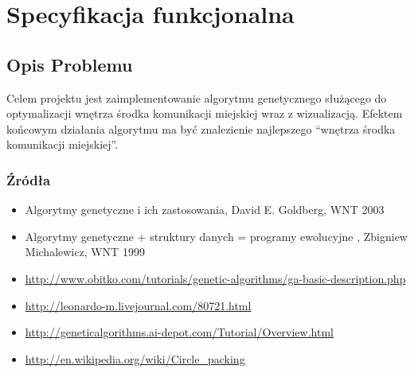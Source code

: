 \documentclass[bibtotocnumbered, headsepline,normalheadings,12pt,polish]{scrreprt}
\begin{document}
%
%
%
%

\chapter{Specyfikacja funkcjonalna}

\section{Opis Problemu}
Celem projektu jest zaimplementowanie algorytmu genetycznego służącego do optymalizacji wnętrza środka komunikacji miejskiej wraz z wizualizacją.
Efektem końcowym działania algorytmu ma być znalezienie najlepszego ``wnętrza środka komunikacji miejskiej''.

\subsection{Źródła}
\begin{itemize}
\item Algorytmy genetyczne i ich zastosowania, David E. Goldberg, WNT 2003
\item Algorytmy genetyczne + struktury danych = programy ewolucyjne , Zbigniew Michalewicz, WNT 1999
\item \url{http://www.obitko.com/tutorials/genetic-algorithms/ga-basic-description.php}
\item \url{http://leonardo-m.livejournal.com/80721.html}
\item \url{http://geneticalgorithms.ai-depot.com/Tutorial/Overview.html}
\item \url{http://en.wikipedia.org/wiki/Circle_packing}
\end{itemize}
\end{document}
